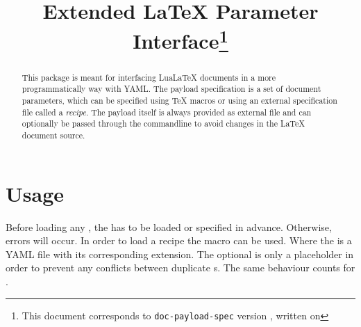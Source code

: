 \documentclass{ltxdoc}
\begin{document}
    \title{Extended \LaTeX{} Parameter Interface\thanks{This document corresponds to \texttt{doc-payload-spec} version \gitversion, written on \gitdate}}
    \maketitle

    \begin{abstract}
        This package is meant for interfacing Lua\LaTeX{} documents in a more programmatically way with YAML\@.
        The payload specification is a set of document parameters, which can be specified using \TeX{} macros or using an external specification file called a \textit{recipe}.
        The payload itself is always provided as external file and can optionally be passed through the commandline to avoid changes in the \LaTeX{} document source.
    \end{abstract}

    \section{Usage}
    Before loading any , the  has to be loaded or specified in advance.
    Otherwise, errors will occur.
    \DescribeMacro{\loadrecipe}
    In order to load a recipe the macro \cmd{\loadrecipe} can be used.
    Where the  is a YAML file with its corresponding extension.
    The optional  is only a placeholder in order to prevent any conflicts between duplicate s.
    \DescribeMacro{\loadpayload} The same behaviour counts for \cmd{\loadpayload}.

    \clearpage
\end{document}
